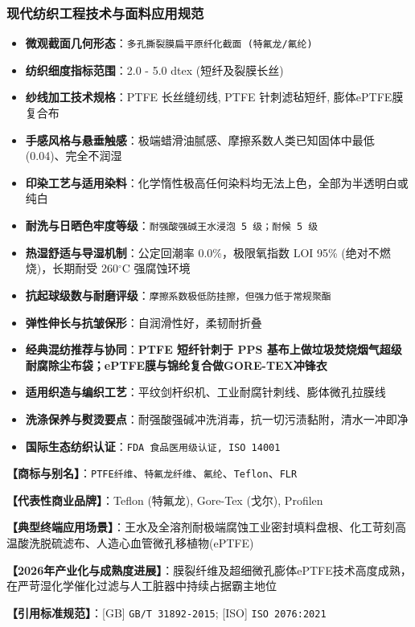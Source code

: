\documentclass[11pt,openright,twoside,UTF8]{ctexbook}
\begin{document}
\subsubsection*{现代纺织工程技术与面料应用规范}
\begin{itemize} \setlength{\itemsep}{2pt}
    \item \textbf{微观截面几何形态}：\texttt{多孔撕裂膜扁平原纤化截面 (特氟龙/氟纶)}
    \item \textbf{纺织细度指标范围}：2.0 - 5.0 dtex (短纤及裂膜长丝)
    \item \textbf{纱线加工技术规格}：PTFE 长丝缝纫线, PTFE 针刺滤毡短纤, 膨体ePTFE膜复合布
    \item \textbf{手感风格与悬垂触感}：极端蜡滑油腻感、摩擦系数人类已知固体中最低(0.04)、完全不润湿
    \item \textbf{印染工艺与适用染料}：化学惰性极高任何染料均无法上色，全部为半透明白或纯白
    \item \textbf{耐洗与日晒色牢度等级}：\texttt{耐强酸强碱王水浸泡 5 级；耐候 5 级}
    \item \textbf{热湿舒适与导湿机制}：公定回潮率 0.0\%，极限氧指数 LOI 95\% (绝对不燃烧)，长期耐受 260$^\circ\mathrm{C}$ 强腐蚀环境
    \item \textbf{抗起球级数与耐磨评级}：\texttt{摩擦系数极低防挂擦，但强力低于常规聚酯}
    \item \textbf{弹性伸长与抗皱保形}：自润滑性好，柔韧耐折叠
    \item \textbf{经典混纺推荐与协同}：\textbf{PTFE 短纤针刺于 PPS 基布上做垃圾焚烧烟气超级耐腐除尘布袋；ePTFE膜与锦纶复合做GORE-TEX冲锋衣}
    \item \textbf{适用织造与编织工艺}：平纹剑杆织机、工业耐腐针刺线、膨体微孔拉膜线
    \item \textbf{洗涤保养与熨烫要点}：耐强酸强碱冲洗消毒，抗一切污渍黏附，清水一冲即净
    \item \textbf{国际生态纺织认证}：\texttt{FDA 食品医用级认证, ISO 14001}
\end{itemize}
\vspace{0.2cm}

\noindent\textbf{【商标与别名】}：\texttt{PTFE纤维}、\texttt{特氟龙纤维}、\texttt{氟纶}、\texttt{Teflon}、\texttt{FLR}\par
\noindent\textbf{【代表性商业品牌】}：Teflon (特氟龙), Gore-Tex (戈尔), Profilen\par
\noindent\textbf{【典型终端应用场景】}：王水及全溶剂耐极端腐蚀工业密封填料盘根、化工苛刻高温酸洗脱硫滤布、人造心血管微孔移植物(ePTFE)\par
\noindent\textbf{【2026年产业化与成熟度进展】}：膜裂纤维及超细微孔膨体ePTFE技术高度成熟，在严苛湿化学催化过滤与人工脏器中持续占据霸主地位\par
\noindent\textbf{【引用标准规范】}：[GB] \texttt{GB/T 31892-2015}; [ISO] \texttt{ISO 2076:2021}\par
\vspace{0.5cm}
\end{document}
